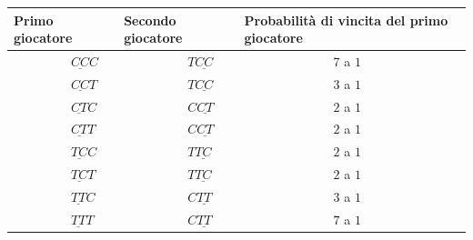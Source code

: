 \documentclass[12pt]{article}
\begin{document}
\begin{center}
	\begin{tabular}{ |p{3.4cm}|p{3.7cm}|p{5cm}| }
		\hline
		\textbf{Primo giocatore} & \textbf{Secondo giocatore} & \textbf{Probabilità di vincita del primo giocatore} \\
 		\hline
 		\ \ \ \ \ \ \ \ \ $\underline{CC}C$ & \ \ \ \ \ \ \ \ \ \ $T\underline{CC}$ & \ \ \ \ \ \ \ \ \ \ \ \ \ \ $7$ a $1$ \\
 		\hline
 		\ \ \ \ \ \ \ \ \ $\underline{CC}T$ & \ \ \ \ \ \ \ \ \ \ $T\underline{CC}$ & \ \ \ \ \ \ \ \ \ \ \ \ \ \ $3$ a $1$ \\
 		\hline
 		\ \ \ \ \ \ \ \ \ $\underline{CT}C$ & \ \ \ \ \ \ \ \ \ \ $C\underline{CT}$ & \ \ \ \ \ \ \ \ \ \ \ \ \ \ $2$ a $1$ \\
 		\hline
 		\ \ \ \ \ \ \ \ \ $\underline{CT}T$ & \ \ \ \ \ \ \ \ \ \ $C\underline{CT}$ & \ \ \ \ \ \ \ \ \ \ \ \ \ \ $2$ a $1$ \\
 		\hline
 		\ \ \ \ \ \ \ \ \ $\underline{TC}C$ & \ \ \ \ \ \ \ \ \ \ $T\underline{TC}$ & \ \ \ \ \ \ \ \ \ \ \ \ \ \ $2$ a $1$ \\
 		\hline
 		\ \ \ \ \ \ \ \ \ $\underline{TC}T$ & \ \ \ \ \ \ \ \ \ \ $T\underline{TC}$ & \ \ \ \ \ \ \ \ \ \ \ \ \ \ $2$ a $1$ \\
 		\hline  
 		\ \ \ \ \ \ \ \ \ $\underline{TT}C$ & \ \ \ \ \ \ \ \ \ \ $C\underline{TT}$ & \ \ \ \ \ \ \ \ \ \ \ \ \ \ $3$ a $1$ \\
 		\hline
 		\ \ \ \ \ \ \ \ \ $\underline{TT}T$ & \ \ \ \ \ \ \ \ \ \ $C\underline{TT}$ & \ \ \ \ \ \ \ \ \ \ \ \ \ \ $7$ a $1$ \\
 		\hline
	\end{tabular} 
\end{center}
\end{document}
